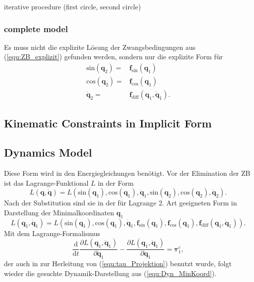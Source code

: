 \documentclass[letterpaper, 10 pt, conference]{ieeeconf}  %
\begin{document}
iterative procedure (first circle, second circle)

\subsubsection{complete model}



Es muss nicht die explizite Lösung der Zwangsbedingungen aus (\ref{equ:ZB_explizit}) gefunden werden, sondern nur die explizite Form für 
%
\begin{align}
\mathrm{sin}(\bm{q}_2) =& \bm{f}_\mathrm{sin}(\bm{q}_1) \\
\mathrm{cos}(\bm{q}_2) =& \bm{f}_\mathrm{cos}(\bm{q}_1) \\
\dot{\bm{q}}_2 =& \bm{f}_\mathrm{diff}(\bm{q}_1,\dot{\bm{q}}_1).
\end{align}


\subsection{Kinematic Constraints in Implicit Form}



\subsection{Dynamics Model}

\label{sec:Lagrange2Elim}
%
Diese Form wird in den Energiegleichungen benötigt.
Vor der Elimination der ZB ist das Lagrange-Funktional $L$ in der Form
\begin{equation}
L(\bm{q},\dot{\bm{q}})=L(\mathrm{sin}(\bm{q}_1),\mathrm{cos}(\bm{q}_1),\dot{\bm{q}}_1,\mathrm{sin}(\bm{q}_2),\mathrm{cos}(\bm{q}_2),\dot{\bm{q}}_2).
\end{equation}
Nach der Substitution sind sie in der für Lagrange 2. Art geeigneten Form in Darstellung der Minimalkoordinaten $\bm{q}_1$
%
\begin{equation}
L(\bm{q}_1,\dot{\bm{q}}_1)=L(\mathrm{sin}(\bm{q}_1),\mathrm{cos}(\bm{q}_1),\dot{\bm{q}}_1,\bm{f}_\mathrm{sin}(\bm{q}_1),\bm{f}_\mathrm{cos}(\bm{q}_1), \bm{f}_\mathrm{diff}(\bm{q}_1,\dot{\bm{q}}_1)).
\end{equation}
%
Mit dem Lagrange-Formalismus
%
\begin{equation}
\frac{\mathrm{d}}{\mathrm{d}t}\frac{\partial L(\bm{q}_1,\dot{\bm{q}}_1)}{\partial \dot{\bm{q}}_1} - \frac{\partial L(\bm{q}_1,\dot{\bm{q}}_1)}{\partial \bm{q}_1} = \bm{\tau}^c_1,
\end{equation}
%
der auch in \cite{NakamuraGho1989} zur Herleitung von (\ref{equ:tau_Projektion}) benutzt wurde, folgt wieder die gesuchte Dynamik-Darstellung aus (\ref{equ:Dyn_MinKoord}).
\end{document}
